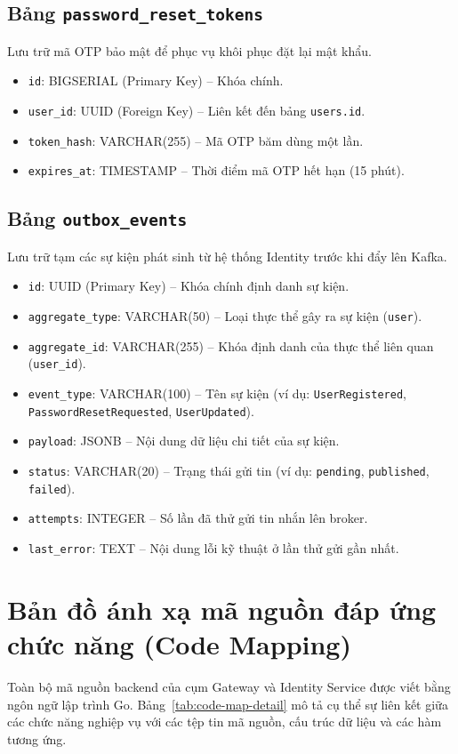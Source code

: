 \documentclass[14pt,a4paper,oneside]{extreport}
\begin{document}
\subsection{Bảng \texttt{password\_reset\_tokens}}
Lưu trữ mã OTP bảo mật để phục vụ khôi phục đặt lại mật khẩu.
\begin{itemize}[leftmargin=1.5cm]
  \item \texttt{id}: BIGSERIAL (Primary Key) -- Khóa chính.
  \item \texttt{user\allowbreak\_id}: UUID (Foreign Key) -- Liên kết đến bảng \texttt{users.id}.
  \item \texttt{token\allowbreak\_hash}: VARCHAR(255) -- Mã OTP băm dùng một lần.
  \item \texttt{expires\allowbreak\_at}: TIMESTAMP -- Thời điểm mã OTP hết hạn (15 phút).
\end{itemize}

\subsection{Bảng \texttt{outbox\_events}}
Lưu trữ tạm các sự kiện phát sinh từ hệ thống Identity trước khi đẩy lên Kafka.
\begin{itemize}[leftmargin=1.5cm]
  \item \texttt{id}: UUID (Primary Key) -- Khóa chính định danh sự kiện.
  \item \texttt{aggregate\allowbreak\_type}: VARCHAR(50) -- Loại thực thể gây ra sự kiện (\texttt{user}).
  \item \texttt{aggregate\allowbreak\_id}: VARCHAR(255) -- Khóa định danh của thực thể liên quan (\texttt{user\allowbreak\_id}).
  \item \texttt{event\allowbreak\_type}: VARCHAR(100) -- Tên sự kiện (ví dụ: \texttt{UserRegistered}, \allowbreak \texttt{PasswordResetRequested}, \allowbreak \texttt{UserUpdated}).
  \item \texttt{payload}: JSONB -- Nội dung dữ liệu chi tiết của sự kiện.
  \item \texttt{status}: VARCHAR(20) -- Trạng thái gửi tin (ví dụ: \texttt{pending}, \allowbreak \texttt{published}, \allowbreak \texttt{failed}).
  \item \texttt{attempts}: INTEGER -- Số lần đã thử gửi tin nhắn lên broker.
  \item \texttt{last\allowbreak\_error}: TEXT -- Nội dung lỗi kỹ thuật ở lần thử gửi gần nhất.
\end{itemize}

\section{Bản đồ ánh xạ mã nguồn đáp ứng chức năng (Code Mapping)}
Toàn bộ mã nguồn backend của cụm Gateway và Identity Service được viết bằng ngôn ngữ lập trình Go. Bảng~\ref{tab:code-map-detail} mô tả cụ thể sự liên kết giữa các chức năng nghiệp vụ với các tệp tin mã nguồn, cấu trúc dữ liệu và các hàm tương ứng.
\end{document}
